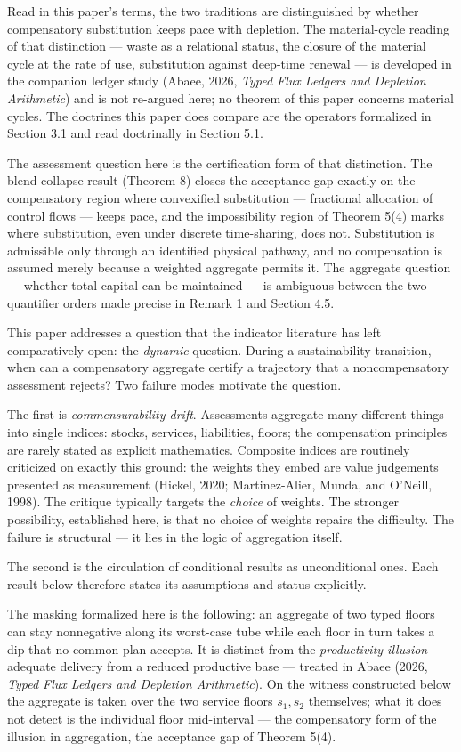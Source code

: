 \documentclass[review,11pt]{elsarticle}
\begin{document}
Read in this paper's terms, the two traditions are distinguished by
whether compensatory substitution keeps pace with depletion. The
material-cycle reading of that distinction --- waste as a relational
status, the closure of the material cycle at the rate of use,
substitution against deep-time renewal --- is developed in the companion ledger study (Abaee, 2026, \emph{Typed Flux Ledgers and Depletion Arithmetic}) and is not re-argued here; no theorem of this paper concerns material cycles. The
doctrines this paper does compare are the operators formalized in
Section 3.1 and read doctrinally in Section 5.1.

The assessment question here is the certification form of that
distinction. The blend-collapse result (Theorem 8) closes the acceptance
gap exactly on the compensatory region where convexified substitution
--- fractional allocation of control flows --- keeps pace, and the
impossibility region of Theorem 5(4) marks where substitution, even
under discrete time-sharing, does not. Substitution is admissible only
through an identified physical pathway, and no compensation is assumed
merely because a weighted aggregate permits it. The aggregate question --- whether total capital can be maintained --- is ambiguous between the two quantifier orders made precise in Remark 1 and Section 4.5.

This paper addresses a question that the indicator literature has left
comparatively open: the \emph{dynamic} question. During a sustainability
transition, when can a compensatory aggregate certify a trajectory that
a noncompensatory assessment rejects? Two failure modes motivate the
question.

The first is \emph{commensurability drift}. Assessments aggregate
many different things into single indices: stocks, services,
liabilities, floors; the compensation principles are rarely stated as
explicit mathematics.
Composite indices are routinely criticized on exactly this ground: the
weights they embed are value judgements presented as measurement
(Hickel, 2020; Martinez-Alier, Munda, and O'Neill, 1998). The critique
typically targets the \emph{choice} of weights. The stronger possibility, established here, is that no choice of weights repairs the difficulty. The failure is structural --- it lies in
the logic of aggregation itself.

The second is the circulation of conditional results as unconditional ones. Each result below therefore states its assumptions and status explicitly.

The masking formalized here is the following: an aggregate of two typed
floors can stay nonnegative along its worst-case tube while each floor
in turn takes a dip that no common plan accepts. It is distinct from the \emph{productivity illusion} --- adequate delivery from a reduced productive base --- treated in Abaee (2026, \emph{Typed Flux Ledgers and Depletion Arithmetic}). On the
witness constructed below the aggregate is taken over the two service
floors \(s_1, s_2\) themselves; what it does not detect is the individual floor mid-interval --- the compensatory form of the illusion in aggregation, the acceptance gap of Theorem 5(4).
\end{document}
